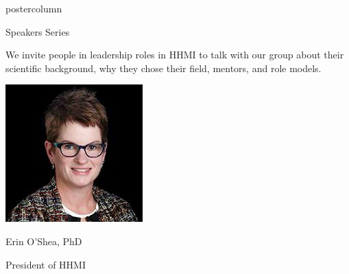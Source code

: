 \documentclass{beamer}
\newlength{\columnheight}
\begin{document}
\begin{frame}
\begin{columns}
\begin{column}{.33\textwidth}
\begin{beamercolorbox}[center,wd=\textwidth]{postercolumn}
\begin{minipage}[T]{.95\textwidth}
				\parbox[t][\columnheight]{\textwidth}{
					\begin{myblock}{Speakers Series}
            \begin{addmargin}[1em]{1em}
                We invite people in leadership roles in HHMI to talk with our group about their scientific background, why they chose their field, mentors, and role models.
                \vspace{1cm}
            \end{addmargin}
            \begin{addmargin}[1em]{1em}
                \centering
                \begin{minipage}{0.4\linewidth}
                    \includegraphics[width=\linewidth]{img/erin.jpg}
                    \centerline{Erin O'Shea, PhD}\newline
                    \centerline{President of HHMI}
                \end{minipage}
                \hspace{0.75cm}
                \begin{minipage}{0.4\linewidth}

\end{minipage}
\end{addmargin}
\end{myblock}}
\end{minipage}
\end{beamercolorbox}
\end{column}
\end{columns}
\end{frame}
\end{document}
